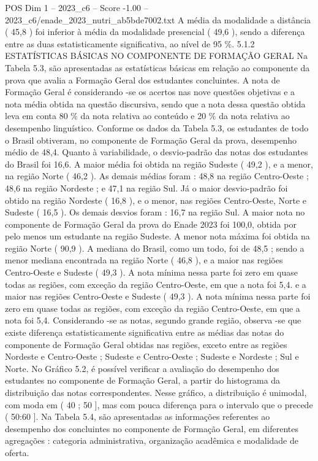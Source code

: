 \begin{textsample}{POS Dim 1 – 2023\_c6 – Score -1.00 – 2023\_c6/enade\_2023\_nutri\_ab5bde7002.txt}
A média da modalidade a distância ( 45,8 ) foi inferior à média da modalidade presencial ( 49,6 ), sendo a diferença entre as duas estatisticamente significativa, ao nível de 95 \%. 5.1.2 ESTATÍSTICAS BÁSICAS NO COMPONENTE DE FORMAÇÃO GERAL Na Tabela 5.3, são apresentadas as estatísticas básicas em relação ao componente da prova que avalia a Formação Geral dos estudantes concluintes.
A nota de Formação Geral é considerando -se os acertos nas nove questões objetivas e a nota média obtida na questão discursiva, sendo que a nota dessa questão obtida leva em conta 80 \% da nota relativa ao conteúdo e 20 \% da nota relativa ao desempenho linguístico.
Conforme os dados da Tabela 5.3, os estudantes de todo o Brasil obtiveram, no componente de Formação Geral da prova, desempenho médio de 48,4.
Quanto à variabilidade, o desvio-padrão das notas dos estudantes do Brasil foi 16,6.
A maior média foi obtida na região Sudeste ( 49,2 ), e a menor, na região Norte ( 46,2 ).
As demais médias foram : 48,8 na região Centro-Oeste ; 48,6 na região Nordeste ; e 47,1 na região Sul.
Já o maior desvio-padrão foi obtido na região Nordeste ( 16,8 ), e o menor, nas regiões Centro-Oeste, Norte e Sudeste ( 16,5 ).
Os demais desvios foram : 16,7 na região Sul.
A maior nota no componente de Formação Geral da prova do Enade 2023 foi 100,0, obtida por pelo menos um estudante na região Sudeste.
A menor nota máxima foi obtida na região Norte ( 90,9 ).
A mediana do Brasil, como um todo, foi de 48,5 ; sendo a menor mediana encontrada na região Norte ( 46,8 ), e a maior nas regiões Centro-Oeste e Sudeste ( 49,3 ).
A nota mínima nessa parte foi zero em quase todas as regiões, com exceção da região Centro-Oeste, em que a nota foi 5,4. e a maior nas regiões Centro-Oeste e Sudeste ( 49,3 ).
A nota mínima nessa parte foi zero em quase todas as regiões, com exceção da região Centro-Oeste, em que a nota foi 5,4.
Considerando -se as notas, segundo grande região, observa -se que existe diferença estatisticamente significativa entre as médias das notas do componente de Formação Geral obtidas nas regiões, exceto entre as regiões Nordeste e Centro-Oeste ; Sudeste e Centro-Oeste ; Sudeste e Nordeste ; Sul e Norte.
No Gráfico 5.2, é possível verificar a avaliação do desempenho dos estudantes no componente de Formação Geral, a partir do histograma da distribuição das notas correspondentes.
Nesse gráfico, a distribuição é unimodal, com moda em ( 40 ; 50 ], mas com pouca diferença para o intervalo que o precede ( 50:60 ].
Na Tabela 5.4, são apresentadas as informações referentes ao desempenho dos concluintes no componente de Formação Geral, em diferentes agregações : categoria administrativa, organização acadêmica e modalidade de oferta.

\end{textsample}
